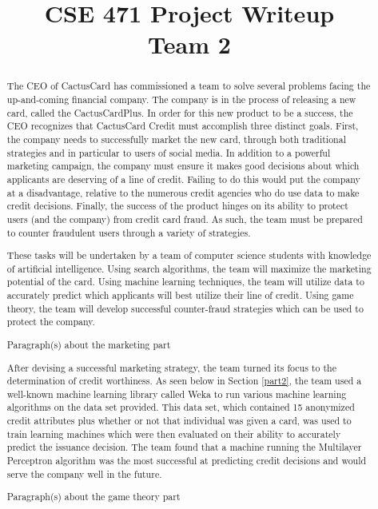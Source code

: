 \documentclass[11pt,journal]{IEEEtran}
\begin{document}
\title{CSE 471 Project Writeup \\ Team 2}

\author{
}

\maketitle

\renewcommand{\abstractname}{Executive Summary}
\begin{abstract}
The CEO of CactusCard has commissioned a team to solve several problems facing the up-and-coming financial company. The company is in the process of releasing a new card, called the CactusCardPlus. In order for this new product to be a success, the CEO recognizes that CactusCard Credit must accomplish three distinct goals. First, the company needs to successfully market the new card, through both traditional strategies and in particular to users of social media. In addition to a powerful marketing campaign, the company must ensure it makes good decisions about which applicants are deserving of a line of credit. Failing to do this would put the company at a disadvantage, relative to the numerous credit agencies who do use data to make credit decisions. Finally, the success of the product hinges on its ability to protect users (and the company) from credit card fraud. As such, the team must be prepared to counter fraudulent users through a variety of strategies.
\par
These tasks will be undertaken by a team of computer science students with knowledge of artificial intelligence. Using search algorithms, the team will maximize the marketing potential of the card. Using machine learning techniques, the team will utilize data to accurately predict which applicants will best utilize their line of credit. Using game theory, the team will develop successful counter-fraud strategies which can be used to protect the company. 
\par
Paragraph(s) about the marketing part
\par
After devising a successful marketing strategy, the team turned its focus to the determination of credit worthiness. As seen below in Section \ref{part2}, the team used a well-known machine learning library called Weka to run various machine learning algorithms on the data set provided. This data set, which contained 15 anonymized credit attributes plus whether or not that individual was given a card, was used to train learning machines which were then evaluated on their ability to accurately predict the issuance decision. The team found that a machine running the Multilayer Perceptron algorithm was the most successful at predicting credit decisions and would serve the company well in the future.
\par
Paragraph(s) about the game theory part
\end{abstract}
\end{document}
